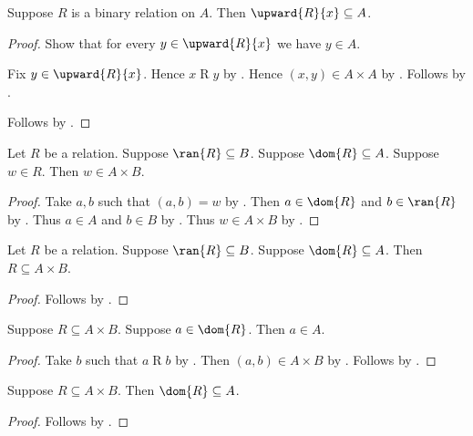 \begin{proposition}\label{binary_relation_upward_subseteq}
    Suppose $R$ is a binary relation on $A$.
    Then $\upward{R}{x}\subseteq A$.
\end{proposition}
\begin{proof}
    Show that for every $y\in\upward{R}{x}$ we have $y\in A$.
    \begin{subproof}
        Fix $y\in\upward{R}{x}$.
        Hence $x\mathrel{R}y$ by .
        Hence $(x,y)\in A\times A$ by .
        Follows by .
    \end{subproof}
    Follows by .
\end{proof}

\begin{proposition}\label{relation_subseteq_intro_elem}
    Let $R$ be a relation.
    Suppose $\ran{R}\subseteq B$.
    Suppose $\dom{R}\subseteq A$.
    Suppose $w\in R$.
    Then $w\in A\times B$.
\end{proposition}
\begin{proof}
    Take $a, b$ such that $(a, b) = w$ by .
    Then $a\in\dom{R}$ and $b\in\ran{R}$ by .
    Thus $a\in A$ and $b\in B$ by .
    Thus $w\in A\times B$ by .
\end{proof}

\begin{proposition}\label{relation_subseteq_intro}
    Let $R$ be a relation.
    Suppose $\ran{R}\subseteq B$.
    Suppose $\dom{R}\subseteq A$.
    Then $R\subseteq A\times B$.
\end{proposition}
\begin{proof}
    Follows by .
\end{proof}

\begin{proposition}\label{relation_subseteq_implies_dom_subseteq_elem}
    Suppose $R\subseteq A\times B$.
    Suppose $a\in\dom{R}$.
    Then $a\in A$.
\end{proposition}
\begin{proof}
    Take $b$ such that $a\mathrel{R}b$ by .
    Then $(a,b)\in A\times B$ by .
    Follows by .
\end{proof}

\begin{proposition}\label{relation_subseteq_implies_dom_subseteq}
    Suppose $R\subseteq A\times B$.
    Then $\dom{R}\subseteq A$.
\end{proposition}
\begin{proof}
    Follows by .
\end{proof}

